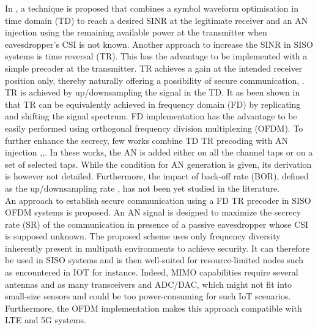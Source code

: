 \documentclass[]{article}
\begin{document}
In \cite{li2013waveform}, a technique is proposed that combines a symbol waveform optimisation in time domain (TD) to reach a desired SINR at the legitimate receiver and an AN injection using the remaining available power at the transmitter when eavesdropper's CSI is not known. Another approach to increase the SINR in SISO systems is time reversal (TR). This has the advantage to be implemented with a simple precoder at the transmitter. TR achieves a gain at the intended receiver position only, thereby naturally offering a possibility of secure communication, \cite{oestges2005characterization}. TR is achieved by up/downsampling the signal in the TD. It as been shown in  \cite{nguyen2019frequency} that TR can be equivalently achieved in frequency domain (FD) by replicating and shifting the signal spectrum. FD implementation has the advantage to be easily performed using orthogonal frequency division multiplexing (OFDM). To further enhance the secrecy, few works combine TD TR precoding with AN injection \cite{xu2018security},\cite{li2017artificial},\cite{li2018artificial}. In these works, the AN is added either on all the channel taps or on a set of selected taps. While the condition for AN generation is given, its derivation is however not detailed. Furthermore, the impact of back-off rate (BOR), defined as the up/downsampling rate \cite{dubois2010use}, has not been yet studied in the literature. \\

An approach to establish secure communication using a FD TR precoder in SISO OFDM systems is proposed. An AN signal is designed to maximize the secrecy rate (SR) of the communication in presence of a passive eavesdropper whose CSI is supposed unknown. The proposed scheme uses only frequency diversity inherently present in multipath environments to achieve security. It can therefore be used in SISO systems and is then well-suited for resource-limited nodes such as encountered in IOT for instance.  Indeed, MIMO capabilities require several antennas and as many transceivers and ADC/DAC, which might not fit into small-size sensors and could  be too power-consuming for such IoT scenarios. Furthermore, the OFDM implementation makes this approach compatible with LTE and 5G systems. \\





 
\end{document}
